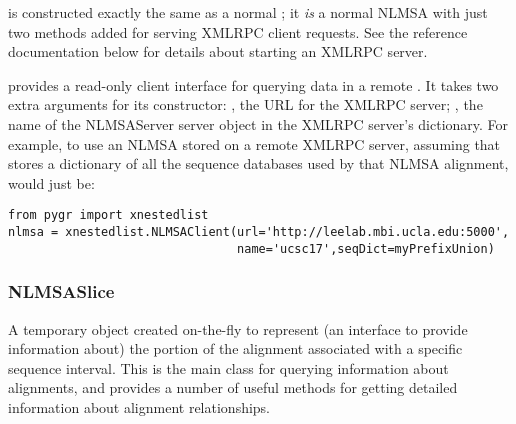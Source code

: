 \documentclass{howto}
\begin{document}
 is constructed exactly the same as a normal ;
it {\em is} a normal NLMSA with just two methods added for serving XMLRPC client
requests.  See the  reference 
documentation below for details about starting an XMLRPC server.

 provides a read-only client interface for querying
data in a remote .  It takes two extra arguments for
its constructor: , the URL for the XMLRPC server; ,
the name of the NLMSAServer server object in the XMLRPC server's dictionary.
For example, to use an NLMSA stored on a remote XMLRPC server,
assuming that  stores a dictionary of all the
sequence databases used by that NLMSA alignment, would just be:
\begin{verbatim}
from pygr import xnestedlist
nlmsa = xnestedlist.NLMSAClient(url='http://leelab.mbi.ucla.edu:5000',
                                name='ucsc17',seqDict=myPrefixUnion)
\end{verbatim}


\subsubsection{NLMSASlice}
A temporary object created on-the-fly to represent (an interface to provide 
information about) the portion of the alignment associated with a specific
sequence interval.  This is the main class for querying information about
alignments, and provides a number of useful methods for getting 
detailed information about alignment relationships.
\end{document}
